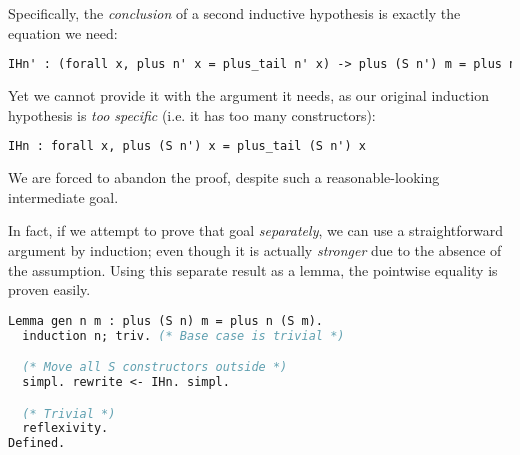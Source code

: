 \iffalse

\begin{lstlisting}[language=ML, xleftmargin=.2\textwidth, xrightmargin=.2\textwidth]
(* Solve equalities by beta-normalising both sides *)
Ltac triv := try (simpl; reflexivity).

(* Prove equivalence of plus and plus_tail *)
Theorem equiv : forall n m, plus n m = plus_tail n m.
  induction n; triv. (* Base case is trivial *)

  (* Inductive case: plus (S n) m = plus_tail (S n) m *)
  intro m.

  (* Beta-reduce the right-hand-side (justification is trivial) *)
  replace (plus_tail (S n) m) with (plus_tail n (S m)); triv.

  (* Use induction hypothesis to replace plus_tail with plus *)
  rewrite <- (IHn (S m)).
\end{lstlisting}

\fi

Specifically, the \emph{conclusion} of a second inductive hypothesis is exactly the equation we need:

\begin{lstlisting}[language=ML, xleftmargin=.2\textwidth, xrightmargin=.2\textwidth]
IHn' : (forall x, plus n' x = plus_tail n' x) -> plus (S n') m = plus n' (S m)
\end{lstlisting}

Yet we cannot provide it with the argument it needs, as our original induction hypothesis is \emph{too specific} (i.e. it has too many  constructors):

\begin{lstlisting}[language=ML, xleftmargin=.2\textwidth, xrightmargin=.2\textwidth]
IHn : forall x, plus (S n') x = plus_tail (S n') x
\end{lstlisting}

We are forced to abandon the proof, despite such a reasonable-looking intermediate goal.

In fact, if we attempt to prove that goal \emph{separately}, we can use a straightforward argument by induction; even though it is actually \emph{stronger} due to the absence of the  assumption. Using this separate result as a lemma, the pointwise equality is proven easily.

\iffalse

\begin{lstlisting}[language=ML, xleftmargin=.2\textwidth, xrightmargin=.2\textwidth]
Lemma gen n m : plus (S n) m = plus n (S m).
  induction n; triv. (* Base case is trivial *)

  (* Move all S constructors outside *)
  simpl. rewrite <- IHn. simpl.

  (* Trivial *)
  reflexivity.
Defined.
\end{lstlisting}

